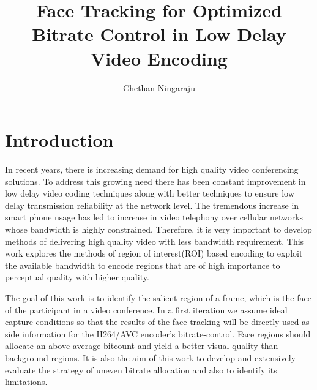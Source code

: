\documentclass[11pt]{article} %
\title{Face Tracking for Optimized Bitrate Control in Low Delay Video Encoding}
\author{Chethan Ningaraju}
\begin{document}
\maketitle
\clearpage
\tableofcontents
\clearpage
\section{Introduction}
	In recent years, there is increasing demand for high quality video conferencing solutions. To address this growing need there has been constant improvement in  low delay video coding techniques along with better techniques to ensure low delay transmission reliability at the network level. The tremendous increase in smart phone usage has led to increase in video telephony over cellular networks whose bandwidth is highly constrained. Therefore, it is very important to develop methods of delivering high quality video with less bandwidth requirement. This work explores the methods of region of interest(ROI) based encoding to exploit the available bandwidth to encode regions that are of high importance to perceptual quality with higher quality. 

The goal of this work is to identify the salient region of a frame, which is the face of the participant in a video conference. In a first iteration we assume ideal capture conditions so that the results of the face tracking will be directly used as side information for the H264/AVC encoder's bitrate-control. Face regions should allocate an above-average bitcount and yield a better visual quality than background regions. It is also the aim of this work to develop and extensively evaluate the strategy of uneven bitrate allocation and also to identify its limitations.
\end{document}

